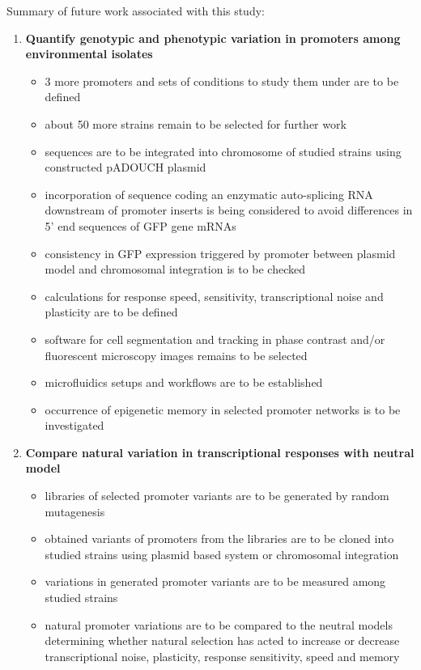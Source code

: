 Summary of future work associated with this study:

\begin{enumerate}

	\item \textbf{Quantify genotypic and phenotypic variation in promoters among environmental  isolates}
	
	\begin{itemize}
	
		\item 3 more promoters and sets of conditions to study them under are to be defined
		\item about 50 more strains remain to be selected for further work
		\item {} sequences are to be integrated into chromosome of studied strains using constructed pADOUCH plasmid
		\item incorporation of sequence coding an enzymatic auto-splicing RNA downstream of promoter inserts is being considered to avoid differences in 5' end sequences of GFP gene mRNAs
		\item consistency in GFP expression triggered by  promoter between plasmid model and chromosomal integration is to be checked
		\item calculations for response speed, sensitivity, transcriptional noise and plasticity are to be defined
		\item software for cell segmentation and tracking in phase contrast and/or fluorescent microscopy images remains to be selected
		\item microfluidics setups and workflows are to be established
		\item occurrence of epigenetic memory in selected promoter networks is to be investigated
			
	\end{itemize}
	
	\item \textbf{Compare natural variation in transcriptional responses with neutral model}
	
	\begin{itemize}
	
		\item libraries of selected promoter variants are to be generated by random mutagenesis
		\item obtained variants of promoters from the libraries are to be cloned into studied strains using plasmid based system or chromosomal integration
		\item variations in generated promoter variants are to be measured among studied strains
		\item natural promoter variations are to be compared to the neutral models determining whether natural selection has acted to increase or decrease transcriptional noise, plasticity, response sensitivity, speed and memory
	
	\end{itemize}

\end{enumerate}

\cleardoublepage%

\shorthandon{-}


